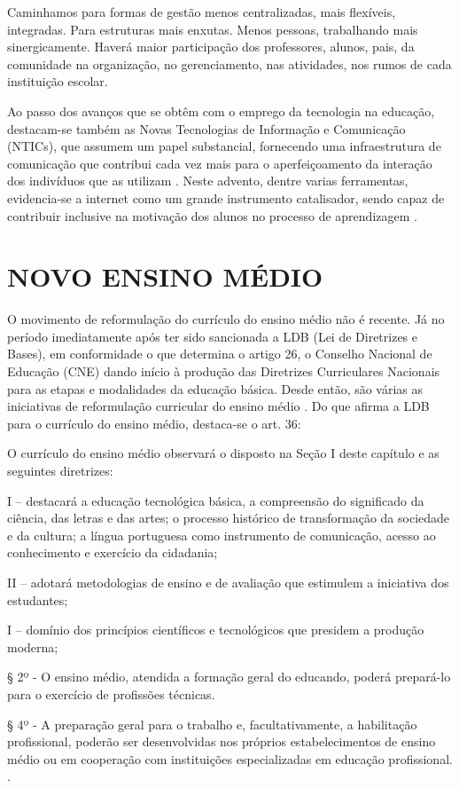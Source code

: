 \begin{citacao}
    Caminhamos para formas de gestão menos centralizadas, mais flexíveis, integradas. Para estruturas mais enxutas. Menos pessoas, trabalhando mais sinergicamente. Haverá maior participação dos professores, alunos, pais, da comunidade na organização, no gerenciamento, nas atividades, nos rumos de cada instituição escolar.
\end{citacao}

Ao passo dos avanços que se obtêm com o emprego da tecnologia na educação, destacam-se também as Novas Tecnologias de Informação e Comunicação (NTICs), que assumem um papel substancial, fornecendo uma infraestrutura de comunicação que contribui cada vez mais para o aperfeiçoamento da interação dos indivíduos que as utilizam \cite{velloso2014informatica}. Neste advento, dentre varias ferramentas, evidencia-se a internet como um grande instrumento catalisador, sendo capaz de contribuir inclusive na motivação dos alunos no processo de aprendizagem \cite{moran1997utilizar}.

\section{NOVO ENSINO MÉDIO}

O movimento de reformulação do currículo do ensino médio não é recente. Já no período imediatamente após ter sido sancionada a LDB (Lei de Diretrizes e Bases), em conformidade o que determina o artigo 26, o Conselho Nacional de Educação (CNE) dando início à produção das Diretrizes Curriculares Nacionais para as etapas e modalidades da educação básica. Desde então, são várias as iniciativas de reformulação curricular do ensino médio \cite{lei9394}. Do que afirma a LDB para o currículo do ensino médio, destaca-se o art. 36:

\begin{citacao}
    O currículo do ensino médio observará o disposto na Seção I deste capítulo e as seguintes diretrizes:

    I – destacará a educação tecnológica básica, a compreensão do significado da ciência, das letras e das artes; o processo histórico de transformação da sociedade e da cultura; a língua portuguesa como instrumento de comunicação, acesso ao conhecimento e exercício da cidadania;
    
    II – adotará metodologias de ensino e de avaliação que estimulem a iniciativa dos estudantes;
    
    I – domínio dos princípios científicos e tecnológicos que presidem a produção moderna;
    
    § 2º - O ensino médio, atendida a formação geral do educando, poderá prepará-lo para o exercício de profissões técnicas.
    
    § 4º - A preparação geral para o trabalho e, facultativamente, a habilitação profissional, poderão ser desenvolvidas nos próprios estabelecimentos de ensino médio ou em cooperação com instituições especializadas em educação profissional. \cite{lei9394}.
\end{citacao}

